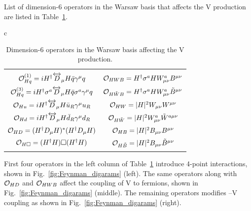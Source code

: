 \documentclass[a4paper,11pt]{article}
\renewcommand{\PV}{{{{V}}}\xspace}
\newcommand{\VH}{{{\PV}{\PH}}\xspace}
\begin{document}
List of dimension-6 operators in the Warsaw basis that affects the \VH production are listed in Table~\ref{Tab:Operators}.
\begin{table}[t]
\small
\centering
\caption{
Dimension-6 operators in the Warsaw basis affecting the \VH production. %
}
\begin{tabular}{c}
\begin{tabular}{c|c}
&\\
                ${\cal O}^{(1)}_{Hq}=i H^\dagger  \overleftrightarrow{D}_\mu H \bar{q}   \gamma^\mu q$&${\cal O}_{HWB}=  H^\dagger \sigma^a H W^a_{\mu\nu}B^{\mu\nu}$ \\
\rule{0pt}{4ex} ${\cal O}^{(3)}_{Hq}=i H^\dagger \sigma^a \overleftrightarrow{D}_\mu H \bar{q}  \sigma^a \gamma^\mu q$ &${\cal O}_{H\tilde{W}B}=  H^\dagger \sigma^a H W^a_{\mu\nu}\tilde{B}^{\mu\nu}$\\
\rule{0pt}{4ex} ${\cal O}_{Hu}=i H^\dagger \overleftrightarrow{D}_\mu H \bar{u}_R  \gamma^\mu u_R$&${\cal O}_{H{W}}= |H|^2 W_{\mu\nu}{W}^{\mu\nu}$\\
\rule{0pt}{4ex} ${\cal O}_{Hd}=i H^\dagger \overleftrightarrow{D}_\mu H \bar{d}_R  \gamma^\mu d_R$&${\cal O}_{H\tilde{W}}= |H|^2 W^a_{\mu\nu}\tilde{W}^{a \mu\nu}$\\
\rule{0pt}{4ex} ${\cal O}_{HD}=(H^\dagger  {D}_\mu H)^*(H^\dagger  {D}_\mu H)$& ${\cal O}_{HB}= |H|^2 B_{\mu\nu}B^{\mu\nu}$\\
\rule{0pt}{4ex} ${\cal O}_{H\square}=(H^\dagger H) \square (H^\dagger H)$& ${\cal O}_{H\tilde{B}}= |H|^2 B_{\mu\nu}\tilde{B}^{\mu\nu}$\\
&\\
 \end{tabular}
\end{tabular}
\label{Tab:Operators}
\end{table}
First four operators in the left column of Table~\ref{Tab:Operators} introduce 4-point interactions, shown in Fig.~\ref{fig:Feynman_digarams} (left). 
The same operators along with ${\cal O}_{HD}$ and ${\cal O}_{HWB}$ affect the coupling of \PV to fermions, shown in Fig.~\ref{fig:Feynman_digarams} (middle). 
The remaining operators modifies \PH--\PV coupling as shown in Fig.~\ref{fig:Feynman_digarams} (right). 
\end{document}
